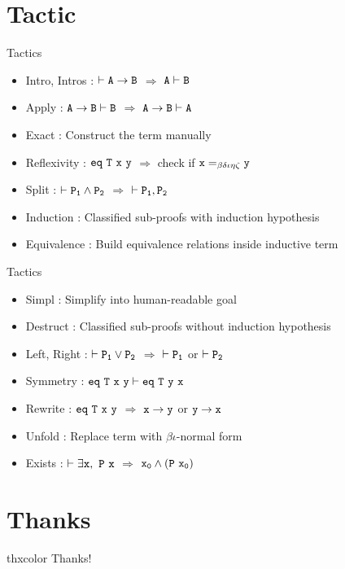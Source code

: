 \documentclass[UTF-8]{beamer}
\begin{document}
\section{Tactic}
\begin{frame}{Tactics}
\begin{itemize}
\item Intro, Intros : $\tt \vdash A\to B$ $\Rightarrow$ $\tt A\vdash B$
\item Apply : $\tt A\to B\vdash B$ $\Rightarrow$ $\tt A\to B\vdash A$
\item Exact : Construct the term manually
\item Reflexivity : $\tt eq\ T\ x\ y$ $\Rightarrow$ check if $\tt x=_{\beta\delta\iota\eta\zeta}y$
\item Split : $\tt \vdash P_1\wedge P_2$ $\Rightarrow$ $\tt \vdash P_1,P_2$
\item Induction : Classified sub-proofs with induction hypothesis
\item Equivalence : Build equivalence relations inside inductive term
\end{itemize}
\end{frame}

\begin{frame}{Tactics}
\begin{itemize}
\item Simpl : Simplify into human-readable goal 
\item Destruct : Classified sub-proofs without induction hypothesis
\item Left, Right : $\tt \vdash P_1\vee P_2$ $\Rightarrow$ $\tt \vdash P_1$ or $\tt\vdash P_2$ 
\item Symmetry : $\tt eq\ T\ x\ y\vdash eq\ T\ y\ x$
\item Rewrite : $\tt eq\ T\ x\ y$ $\Rightarrow$ $\tt x\to y$ or $\tt y\to x$
\item Unfold : Replace term with $\beta\iota$-normal form
\item Exists : $\tt \vdash\exists x,\ P\ x$ $\Rightarrow$ $\tt x_0\wedge(P\ x_0)$
\end{itemize}
\end{frame}

\section*{Thanks}
\begin{frame}
\LARGE
\begin{beamercolorbox}[center,ht=3em]{thxcolor}
\vspace{1em}
\Huge Thanks!
\end{beamercolorbox}
\end{frame}
\end{document}
